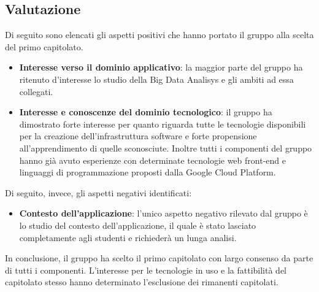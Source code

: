 \subsection{Valutazione}
Di seguito sono elencati gli aspetti positivi che hanno portato il gruppo alla scelta del primo capitolato.
\begin{itemize}
\item \textbf{Interesse verso il dominio applicativo}: la maggior parte del gruppo ha ritenuto d'interesse lo studio della Big Data Analisys e gli ambiti ad essa collegati.
\item \textbf{Interesse e conoscenze del dominio tecnologico}: il gruppo ha dimostrato forte interesse per quanto riguarda tutte le tecnologie disponibili per la creazione dell'infrastruttura software e forte propensione all'apprendimento di quelle sconosciute. Inoltre tutti i componenti del gruppo hanno già avuto esperienze con determinate tecnologie web front-end e linguaggi di programmazione proposti dalla Google Cloud Platform.
\end{itemize}
Di seguito, invece, gli aspetti negativi identificati:
\begin{itemize}
\item \textbf{Contesto dell'applicazione}: l'unico aspetto negativo rilevato dal gruppo è lo studio del contesto dell'applicazione, il quale è stato lasciato completamente agli studenti e richiederà un lunga analisi.
\end{itemize}
In conclusione, il gruppo ha scelto il primo capitolato con largo consenso da parte di tutti i componenti. L'interesse per le tecnologie in uso e la fattibilità del capitolato stesso hanno determinato l'esclusione dei rimanenti capitolati.





